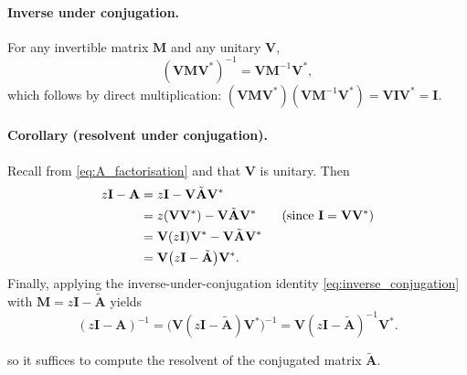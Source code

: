 \documentclass[a4paper,11pt]{article}
\begin{document}
\paragraph{Inverse under conjugation.}
For any invertible matrix $\mathbf{M}$ and any unitary $\mathbf{V}$,
\begin{equation}\label{eq:inverse_conjugation}
(\mathbf{V}\mathbf{M}\mathbf{V}^*)^{-1} = \mathbf{V}\mathbf{M}^{-1}\mathbf{V}^*,
\end{equation}
which follows by direct multiplication:
$(\mathbf{V}\mathbf{M}\mathbf{V}^*)(\mathbf{V}\mathbf{M}^{-1}\mathbf{V}^*)=\mathbf{V}\mathbf{I}\mathbf{V}^*=\mathbf{I}$.

\paragraph{Corollary (resolvent under conjugation).}
Recall from \eqref{eq:A_factorisation} and that $\mathbf{V}$ is unitary.
Then
\begin{align}
z\mathbf{I}-\mathbf{A}
&= z\mathbf{I}-\mathbf{V}\tilde{\mathbf{A}}\mathbf{V}^* \notag\\
&= z(\mathbf{V}\mathbf{V}^*)-\mathbf{V}\tilde{\mathbf{A}}\mathbf{V}^* \qquad (\text{since } \mathbf{I}=\mathbf{V}\mathbf{V}^*) \notag\\
&= \mathbf{V}(z\mathbf{I})\mathbf{V}^*-\mathbf{V}\tilde{\mathbf{A}}\mathbf{V}^* \notag\\
&= \mathbf{V}\bigl(z\mathbf{I}-\tilde{\mathbf{A}}\bigr)\mathbf{V}^*. \label{eq:resolvent_conjugation_step1}
\end{align}
Finally, applying the inverse-under-conjugation identity \eqref{eq:inverse_conjugation} with $\mathbf{M}=z\mathbf{I}-\tilde{\mathbf{A}}$ yields
\begin{equation}\label{eq:resolvent_conjugation}
(z\mathbf{I}-\mathbf{A})^{-1}
=\bigl(\mathbf{V}(z\mathbf{I}-\tilde{\mathbf{A}})\mathbf{V}^*\bigr)^{-1}
=\mathbf{V}(z\mathbf{I}-\tilde{\mathbf{A}})^{-1}\mathbf{V}^*.
\end{equation}




so it suffices to compute the resolvent of the conjugated matrix $\tilde{\mathbf{A}}$.
\end{document}
